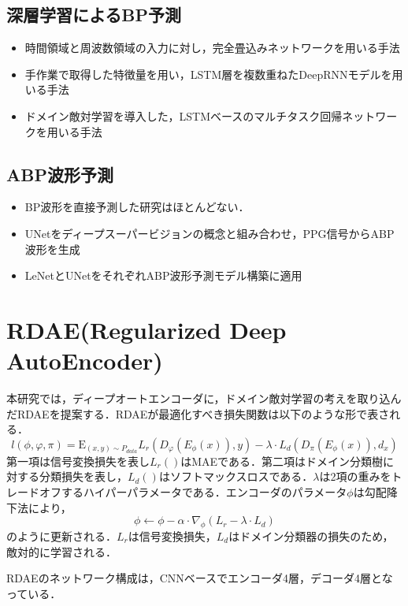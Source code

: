 \documentclass[dvipdfmx]{jsarticle}
\begin{document}
\subsection{深層学習によるBP予測}
\begin{itemize}
    \item 時間領域と周波数領域の入力に対し，完全畳込みネットワークを用いる手法
    \item 手作業で取得した特徴量を用い，LSTM層を複数重ねたDeepRNNモデルを用いる手法
    \item ドメイン敵対学習を導入した，LSTMベースのマルチタスク回帰ネットワークを用いる手法
\end{itemize}
\subsection{ABP波形予測}
\begin{itemize}
    \item BP波形を直接予測した研究はほとんどない．
    \item UNetをディープスーパービジョンの概念と組み合わせ，PPG信号からABP波形を生成
    \item LeNetとUNetをそれぞれABP波形予測モデル構築に適用
\end{itemize}
\section{RDAE(Regularized Deep AutoEncoder)}
本研究では，ディープオートエンコーダに，ドメイン敵対学習の考えを取り込んだRDAEを提案する．RDAEが最適化すべき損失関数は以下のような形で表される．
\begin{equation}
    l(\phi, \varphi, \pi) = \mathrm{E}_{(x, y) \sim P_{data}} L_r(D_{\varphi} (E_{\phi}(x)), y) - \lambda \cdot L_d (D_\pi (E_{\phi} (x)), d_x)
\end{equation}
第一項は信号変換損失を表し$L_r ()$はMAEである．第二項はドメイン分類樹に対する分類損失を表し，$L_d ()$はソフトマックスロスである．$\lambda $は2項の重みをトレードオフするハイパーパラメータである．エンコーダのパラメータ$\phi$は勾配降下法により，
\begin{equation}
    \phi \leftarrow \phi - \alpha \cdot \nabla_{\phi} (L_r - \lambda \cdot L_d)
\end{equation}
のように更新される．$L_r$は信号変換損失，$L_d$はドメイン分類器の損失のため，敵対的に学習される．

RDAEのネットワーク構成は，CNNベースでエンコーダ4層，デコーダ4層となっている．
\end{document}
